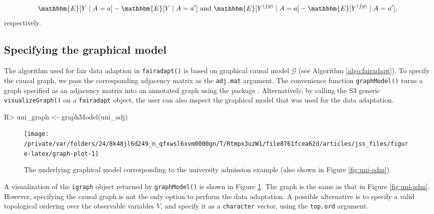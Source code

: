 \documentclass[
  nojss]{jss}
\begin{document}
\[\mathbbm{E}[Y \mid A = a] - \mathbbm{E}[Y \mid A = a'] \text{ and } \mathbbm{E}[ {Y}^{(fp)} \mid A = a] - \mathbbm{E}[ {Y}^{(fp)} \mid A = a'],\]
respectively.

\hypertarget{specifying-the-graphical-model}{%
\subsection{Specifying the graphical
model}\label{specifying-the-graphical-model}}

The algorithm used for fair data adaption in \texttt{fairadapt()} is
based on graphical causal model \(\mathcal{G}\) (see Algorithm
\ref{algo:fairadapt}). To specify the causal graph, we pass the
corresponding adjacency matrix as the \texttt{adj.mat} argument. The
convenience function \texttt{graphModel()} turns a graph specified as an
adjacency matrix into an annotated graph using the  package
\citep{csardi2006igraph}. Alternatively, by calling the S3 generic
\texttt{visualizeGraph()} on a \texttt{fairadapt} object, the user can
also inspect the graphical model that was used for the data adaptation.

\begin{CodeChunk}
\begin{CodeInput}
R> uni_graph <- graphModel(uni_adj)
\end{CodeInput}
\end{CodeChunk}

\begin{CodeChunk}
\begin{figure}

{\centering \texttt{[image: /private/var/folders/24/8k48jl6d249\_n\_qfxwsl6xvm0000gn/T/Rtmpx3uzW1/file8761fcea62d/articles/jss\_files/figure-latex/graph-plot-1]} 

}

\caption{The underlying graphical model corresponding to the university admission example (also shown in Figure \ref{fig:uni-adm}).}\label{fig:graph-plot}
\end{figure}
\end{CodeChunk}

A visualization of the \texttt{igraph} object returned by
\texttt{graphModel()} is shown in Figure \ref{fig:graph-plot}. The graph
is the same as that in Figure \ref{fig:uni-adm}. However, specifying the
causal graph is not the only option to perform the data adaptation. A
possible alternative is to specify a valid topological ordering over the
observable variables \(V\), and specify it as a \texttt{character}
vector, using the \texttt{top.ord} argument.
\end{document}
